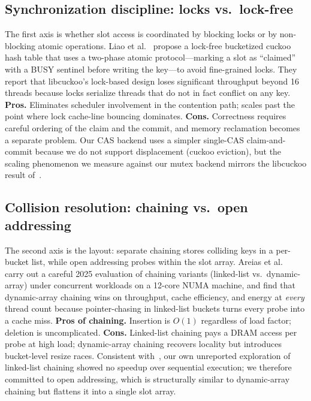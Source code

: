 \documentclass[10pt,twocolumn]{article}
\begin{document}
\subsection{Synchronization discipline: locks vs.\ lock-free}
The first axis is whether slot access is coordinated by blocking
locks or by non-blocking atomic operations. Liao et
al.~\cite{liao2023cuckoo} propose a lock-free bucketized cuckoo hash
table that uses a two-phase atomic protocol---marking a slot as
``claimed'' with a BUSY sentinel before writing the key---to avoid
fine-grained locks. They report that libcuckoo's lock-based design
loses significant throughput beyond 16 threads because locks
serialize threads that do not in fact conflict on any key.
\textbf{Pros.} Eliminates scheduler involvement in the contention
path; scales past the point where lock cache-line bouncing
dominates.
\textbf{Cons.} Correctness requires careful ordering of the claim
and the commit, and memory reclamation becomes a separate problem.
Our CAS backend uses a simpler single-CAS claim-and-commit because
we do not support displacement (cuckoo eviction), but the scaling
phenomenon we measure against our mutex backend mirrors the
libcuckoo result of~\cite{liao2023cuckoo}.

\subsection{Collision resolution: chaining vs.\ open addressing}
The second axis is the layout: separate chaining stores colliding
keys in a per-bucket list, while open addressing probes within the
slot array. Areias et al.~\cite{areias2025chaining} carry out a
careful 2025 evaluation of chaining variants (linked-list vs.\
dynamic-array) under concurrent workloads on a 12-core NUMA
machine, and find that dynamic-array chaining wins on throughput,
cache efficiency, and energy at \emph{every} thread count because
pointer-chasing in linked-list buckets turns every probe into a
cache miss.
\textbf{Pros of chaining.} Insertion is $O(1)$ regardless of load
factor; deletion is uncomplicated.
\textbf{Cons.} Linked-list chaining pays a DRAM access per probe at
high load; dynamic-array chaining recovers locality but introduces
bucket-level resize races. Consistent with~\cite{areias2025chaining},
our own unreported exploration of linked-list chaining showed no
speedup over sequential execution; we therefore committed to open
addressing, which is structurally similar to dynamic-array chaining
but flattens it into a single slot array.
\end{document}
